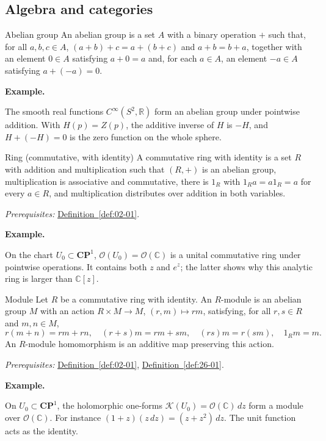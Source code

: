 \documentclass[11pt]{article}
\makeatletter
\newcommand{\R}{\mathbb R}
\newcommand{\C}{\mathbb C}
\newcounter{definition}
\newcommand{\CP}{\mathbf{CP}}
\newcommand{\exampleheading}{\par\medskip\textbf{Example.}\par\smallskip}
\newcommand{\currentdefinition}[1]{\protected@edef\@currentlabel{#1}}
\makeatother
\begin{document}
\subsection*{Algebra and categories}

\begin{definitionbox}{Abelian group}
\currentdefinition{\thedefinition}
\label{def:02-01}
An abelian group is a set $A$ with a binary operation $+$ such that, for all $a,b,c\in A$, $(a+b)+c=a+(b+c)$ and $a+b=b+a$, together with an element $0\in A$ satisfying $a+0=a$ and, for each $a\in A$, an element $-a\in A$ satisfying $a+(-a)=0$.

\exampleheading
The smooth real functions $C^\infty(S^2,\R)$ form an abelian group under pointwise addition. With $H(p)=Z(p)$, the additive inverse of $H$ is $-H$, and $H+(-H)=0$ is the zero function on the whole sphere.
\end{definitionbox}

\begin{definitionbox}{Ring (commutative, with identity)}
\currentdefinition{\thedefinition}
\label{def:26-01}
A commutative ring with identity is a set $R$ with addition and multiplication such that $(R,+)$ is an abelian group, multiplication is associative and commutative, there is $1_R$ with $1_Ra=a1_R=a$ for every $a\in R$, and multiplication distributes over addition in both variables.

\smallskip
\textit{Prerequisites:} \hyperref[def:02-01]{Definition~\ref*{def:02-01}}.

\exampleheading
On the chart $U_0\subset\CP^1$, $\mathcal O(U_0)=\mathcal O(\C)$ is a unital commutative ring under pointwise operations. It contains both $z$ and $e^z$; the latter shows why this analytic ring is larger than $\C[z]$.
\end{definitionbox}

\begin{definitionbox}{Module}
\currentdefinition{\thedefinition}
\label{def:N01}
Let $R$ be a commutative ring with identity. An $R$-module is an abelian group $M$ with an action $R\times M\to M$, $(r,m)\mapsto rm$, satisfying, for all $r,s\in R$ and $m,n\in M$,
\[r(m+n)=rm+rn,\quad(r+s)m=rm+sm,\quad(rs)m=r(sm),\quad1_Rm=m.\]
An $R$-module homomorphism is an additive map preserving this action.

\smallskip
\textit{Prerequisites:} \hyperref[def:02-01]{Definition~\ref*{def:02-01}}, \hyperref[def:26-01]{Definition~\ref*{def:26-01}}.

\exampleheading
On $U_0\subset\CP^1$, the holomorphic one-forms $\mathcal K(U_0)=\mathcal O(\C)\,dz$ form a module over $\mathcal O(\C)$. For instance $(1+z)(z\,dz)=(z+z^2)\,dz$. The unit function acts as the identity.
\end{definitionbox}
\end{document}
